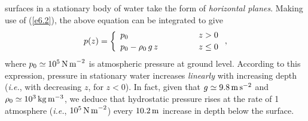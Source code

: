 surfaces in a stationary body of water take the form of {\em horizontal planes}. 
Making use of (\ref{e6.2}), the above equation can be integrated to give
\begin{equation}\label{e6.4}
p(z)=\left\{\begin{array}{llc}
p_0&\mbox{\hspace{1cm}}&z>0\\[0.5ex]
p_0-\rho_0\,g\,z&&z\leq 0
\end{array}\right.,
\end{equation}
where $p_0\simeq 10^5\,{\rm N\,m}^{-2}$ is  atmospheric pressure at ground level. According to this expression,  pressure in stationary water increases {\em linearly}\/ with increasing depth  ({\em i.e.}, with decreasing $z$, for $z<0$). 
In fact, given that $g\simeq 9.8\,{\rm m\,s}^{-2}$ and $\rho_0\simeq 10^3\,{\rm kg\,m^{-3}}$, we deduce that
hydrostatic  pressure rises
at the rate of 1 atmosphere ({\em i.e.}, $10^5\,{\rm N\,m}^{-2}$) every $10.2\,{\rm m}$ increase in depth below the
surface.

